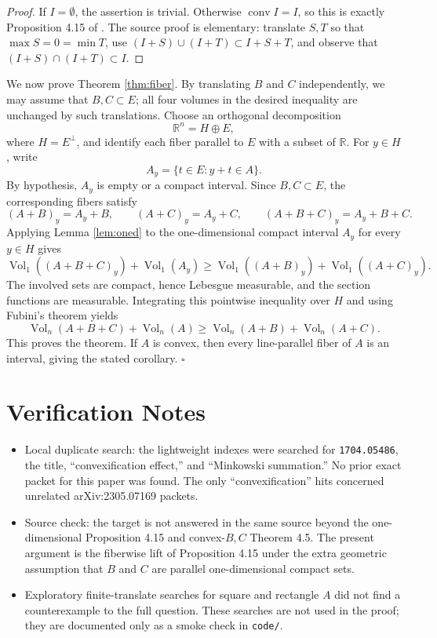 \documentclass[11pt]{article}
\newcommand{\R}{\mathbb{R}}
\newcommand{\vol}{\operatorname{Vol}}
\newcommand{\conv}{\operatorname{conv}}
\begin{document}
\begin{proof}
If \(I=\emptyset\), the assertion is trivial. Otherwise \(\conv I=I\), so this
is exactly Proposition 4.15 of \cite{FMMZ2018}. The source proof is elementary:
translate \(S,T\) so that \(\max S=0=\min T\), use
\((I+S)\cup(I+T)\subset I+S+T\), and observe that
\((I+S)\cap(I+T)\subset I\).
\end{proof}

We now prove Theorem \ref{thm:fiber}. By translating \(B\) and \(C\)
independently, we may assume that \(B,C\subset E\); all four volumes in the
desired inequality are unchanged by such translations. Choose an orthogonal
decomposition
\[
  \R^n=H\oplus E,
\]
where \(H=E^\perp\), and identify each fiber parallel to \(E\) with a subset of
\(\R\). For \(y\in H\), write
\[
  A_y=\{t\in E:y+t\in A\}.
\]
By hypothesis, \(A_y\) is empty or a compact interval. Since \(B,C\subset E\),
the corresponding fibers satisfy
\[
  (A+B)_y=A_y+B,\qquad
  (A+C)_y=A_y+C,\qquad
  (A+B+C)_y=A_y+B+C.
\]
Applying Lemma \ref{lem:oned} to the one-dimensional compact interval \(A_y\)
for every \(y\in H\) gives
\[
  \vol_1((A+B+C)_y)+\vol_1(A_y)
  \ge
  \vol_1((A+B)_y)+\vol_1((A+C)_y).
\]
The involved sets are compact, hence Lebesgue measurable, and the section
functions are measurable. Integrating this pointwise inequality over
\(H\) and using Fubini's theorem yields
\[
  \vol_n(A+B+C)+\vol_n(A)\ge
  \vol_n(A+B)+\vol_n(A+C).
\]
This proves the theorem. If \(A\) is convex, then every line-parallel fiber of
\(A\) is an interval, giving the stated corollary.
\(\square\)

\section*{Verification Notes}

\begin{itemize}
\item Local duplicate search: the lightweight indexes were searched for
\texttt{1704.05486}, the title, ``convexification effect,'' and ``Minkowski
summation.'' No prior exact packet for this paper was found. The only
``convexification'' hits concerned unrelated arXiv:2305.07169 packets.
\item Source check: the target is not answered in the same source beyond the
one-dimensional Proposition 4.15 and convex-\(B,C\) Theorem 4.5. The present
argument is the fiberwise lift of Proposition 4.15 under the extra geometric
assumption that \(B\) and \(C\) are parallel one-dimensional compact sets.
\item Exploratory finite-translate searches for square and rectangle \(A\) did
not find a counterexample to the full question. These searches are not used in
the proof; they are documented only as a smoke check in \texttt{code/}.
\end{itemize}
\end{document}
